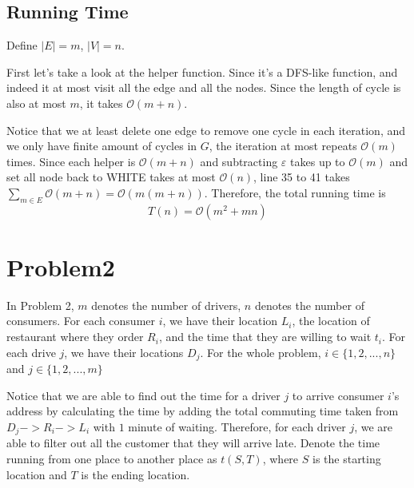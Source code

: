 \documentclass[openany]{article}
\begin{document}
\subsection*{Running Time}
Define $|E| = m$, $|V| = n$.

First let's take a look at the helper function. Since it's a DFS-like function, and indeed it at most visit all the edge and all the nodes. Since the length of cycle is also at most $m$, it takes $\mathcal{O}(m+n)$.

Notice that we at least delete one edge to remove one cycle in each iteration, and we only have finite amount of cycles in $G$, the iteration at most repeats $\mathcal{O}(m)$ times. Since each helper is $\mathcal{O}(m+n)$ and subtracting $\varepsilon$ takes up to $\mathcal{O}(m)$ and set all node back to WHITE takes at most $\mathcal{O}(n)$, line 35 to 41 takes $\sum_{m\in E}\mathcal{O}(m+n) = \mathcal{O}(m(m+n))$.
Therefore, the total running time is 
\[T(n) = \mathcal{O}(m^2+mn)\]

\section*{Problem2}
In Problem 2, $m$ denotes the number of drivers, $n$ denotes the number of consumers. For each consumer $i$, we have their location $L_i$, the location of restaurant where they order $R_i$, and the time that they are willing to wait $t_i$. For each drive $j$, we have their locations $D_j$. For the whole problem, $i \in \{1,2,...,n\}$ and $j \in \{1,2,...,m\}$

Notice that we are able to find out the time for a driver $j$ to arrive consumer $i$'s address by calculating the time by adding the total commuting time taken from $D_j -> R_i -> L_i $ with $1$ minute of waiting. Therefore, for each driver $j$, we are able to filter out all the customer that they will arrive late. Denote the time running from one place to another place as $t(S,T)$, where $S$ is the starting location and $T$ is the ending location.
\end{document}
